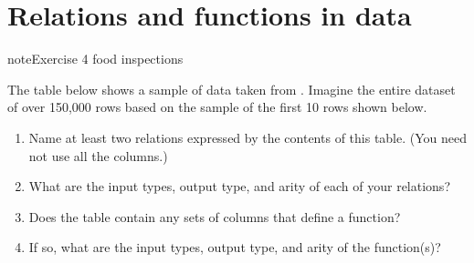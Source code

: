\documentclass[letterpaper,10pt,english]{sphinxmanual}
\begin{document}
\section{Relations and functions in data}
\label{\detokenize{chapter-2-mathematical-foundations:relations-and-functions-in-data}}
\begin{sphinxadmonition}{note}{Exercise 4 \sphinxhyphen{} food inspections}

The table below shows a sample of data taken from .  Imagine the entire dataset of over 150,000 rows based on the sample of the first 10 rows shown below.
\begin{enumerate}
%
\item {} 
Name at least two relations expressed by the contents of this table.  (You need not use all the columns.)

\item {} 
What are the input types, output type, and arity of each of your relations?

\item {} 
Does the table contain any sets of columns that define a function?

\item {} 
If so, what are the input types, output type, and arity of the function(s)?

\end{enumerate}
\end{sphinxadmonition}
\end{document}
